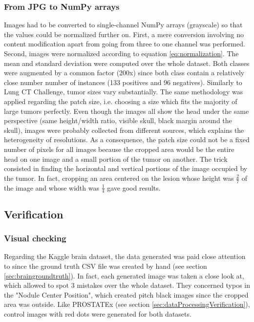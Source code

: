 \subsubsection{From JPG to NumPy arrays}
Images had to be converted to single-channel NumPy arrays (grayscale) so that the values could be normalized further on. First, a mere conversion involving no content modification apart from going from three to one channel was performed. Second, images were normalized according to equation \ref{eq:normalization}. The mean and standard deviation were computed over the whole dataset. Both classes were augmented by a common factor (200x) since both class contain a relatively close number number of instances (133 positives and 96 negatives). Similarly to Lung CT Challenge, tumor sizes vary substantially. The same methodology was applied regarding the patch size, i.e. choosing a size which fits the majority of large tumors perfectly. Even though the images all show the head under the same perspective (same height/width ratio, visible skull, black margin around the skull), images were probably collected from different sources, which explains the heterogeneity of resolutions. As a consequence, the patch size could not be a fixed number of pixels for all images because the cropped area would be the entire head on one image and a small portion of the tumor on another. The trick consisted in finding the horizontal and vertical portions of the image occupied by the tumor. In fact, cropping an area centered on the lesion whose height was $\frac{2}{7}$ of the image and whose width was $\frac{1}{4}$ gave good results. 

\subsection{Verification}
\subsubsection{Visual checking}
Regarding the Kaggle brain dataset, the data generated was paid close attention to since the ground truth CSV file was created by hand (see section \ref{sec:braingroundtruth}). In fact, each generated image was taken a close look at, which allowed to spot 3 mistakes over the whole dataset. They concerned typos in the "Nodule Center Position", which created pitch black images since the cropped area was outside.
Like PROSTATEx (see section \ref{sec:dataProcessingVerification}), control images with red dots were generated for both datasets. 


